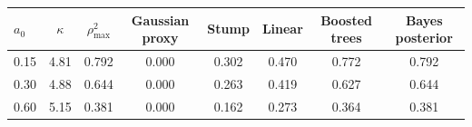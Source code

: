 \begin{tabular*}{\columnwidth}{@{\extracolsep{\fill}}lccccccc@{}}
\toprule
$a_0$ & $\kappa$ & $\rho^2_{\max}$ & Gaussian proxy & Stump & Linear & Boosted trees & Bayes posterior\\
\midrule
0.15 & 4.81 & 0.792 & 0.000 & 0.302 & 0.470 & 0.772 & 0.792\\
0.30 & 4.88 & 0.644 & 0.000 & 0.263 & 0.419 & 0.627 & 0.644\\
0.60 & 5.15 & 0.381 & 0.000 & 0.162 & 0.273 & 0.364 & 0.381\\
\bottomrule
\end{tabular*}
